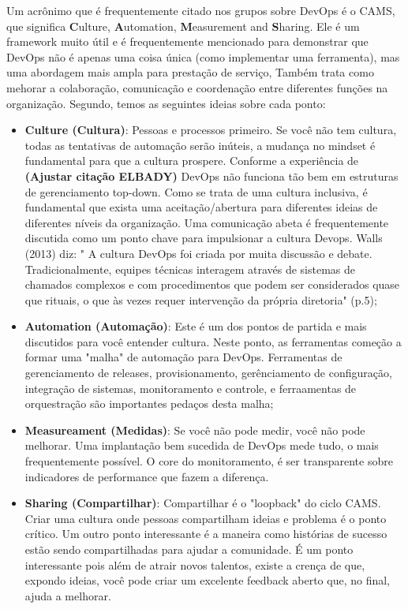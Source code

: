 \documentclass[twoside,english,brazilian]{UNISINOSartigo}
\begin{document}
Um acrônimo que é frequentemente citado nos grupos sobre DevOps é o CAMS, que significa \textbf{C}ulture, \textbf{A}utomation, \textbf{M}easurement and \textbf{S}haring. Ele é um framework muito útil e é frequentemente mencionado para demonstrar que DevOps não é apenas uma coisa única (como implementar uma ferramenta), mas uma abordagem mais ampla para prestação de serviço, Também trata como mehorar a colaboração, comunicação  e coordenação entre diferentes funções na organização. Segundo\cite{Willis}, temos as seguintes ideias sobre cada ponto:
\begin{itemize}
\item \textbf{Culture (Cultura)}: Pessoas e processos primeiro. Se você não tem cultura, todas as tentativas de automação serão inúteis, a mudança no mindset é fundamental para que a cultura prospere. Conforme a experiência de \textbf{(Ajustar citação ELBADY)} DevOps não funciona tão bem em estruturas de gerenciamento top-down. Como se trata de uma cultura inclusiva, é fundamental que exista uma aceitação/abertura  para diferentes ideias de diferentes níveis da organização. Uma comunicação abeta é frequentemente discutida como um ponto chave para impulsionar a cultura Devops. Walls (2013) diz: " A cultura DevOps foi criada por muita discussão e debate. Tradicionalmente, equipes técnicas interagem através de sistemas de chamados complexos e com procedimentos que podem ser considerados quase que rituais, o que às vezes requer intervenção da própria diretoria" (p.5);
\item \textbf{Automation (Automação)}: Este é um dos pontos de partida e mais discutidos para você entender cultura. Neste ponto, as ferramentas começão a formar uma "malha" de automação para DevOps. Ferramentas de gerenciamento de releases, provisionamento, gerênciamento de configuração, integração de sistemas, monitoramento e controle, e ferraamentas de orquestração são importantes pedaços desta malha;
\item \textbf{Measureament (Medidas)}: Se você não pode medir, você não pode melhorar. Uma implantação bem sucedida de DevOps mede tudo, o mais frequentemente possível. O core do monitoramento, é ser transparente sobre indicadores de performance que fazem a diferença. 
\item \textbf{Sharing (Compartilhar)}: Compartilhar é o "loopback" do ciclo CAMS. Criar uma cultura onde pessoas compartilham ideias e problema é o ponto crítico. Um outro ponto interessante é a maneira como histórias de sucesso estão sendo compartilhadas para ajudar a comunidade. É um ponto interessante pois além de atrair novos talentos, existe a crença de que, expondo ideias, você pode criar um excelente feedback aberto que, no final, ajuda a melhorar.
\end{itemize}
 
\end{document}
